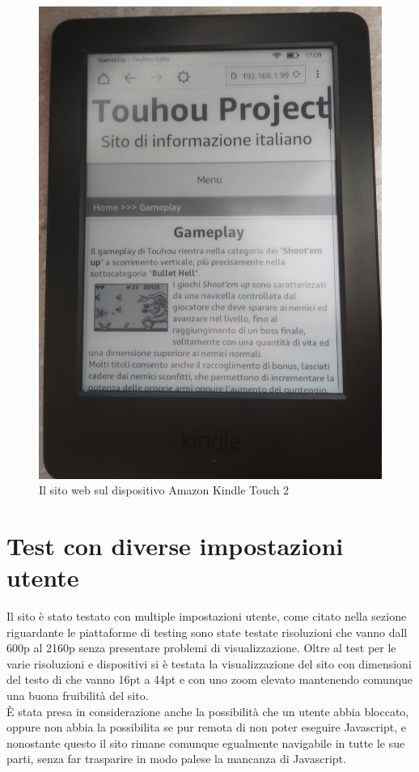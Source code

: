\documentclass[openany, a4paper, 12pt]{report}
\begin{document}
				\begin{figure}[H]
					\centering
					\includegraphics[width=0.7\linewidth]{images/Kindle}
					\caption{Il sito web sul dispositivo Amazon Kindle Touch 2}
				\end{figure}
			
		\section{Test con diverse impostazioni utente}
			Il sito è stato testato con multiple impostazioni utente, come citato nella sezione riguardante le piattaforme di testing sono state testate risoluzioni che vanno dall 600p al 2160p senza presentare problemi di visualizzazione. Oltre al test per le varie risoluzioni e dispositivi si è testata la visualizzazione del sito con dimensioni del testo di che vanno 16pt a 44pt e con uno zoom elevato mantenendo comunque una buona fruibilità del sito.\\
			\`{E} stata presa in considerazione anche la possibilità che un utente abbia bloccato, oppure non abbia la possibilita se pur remota di non poter eseguire Javascript, e nonostante questo il sito rimane comunque egualmente navigabile in tutte le sue parti, senza far trasparire in modo palese la mancanza di Javascript.\\
\end{document}
